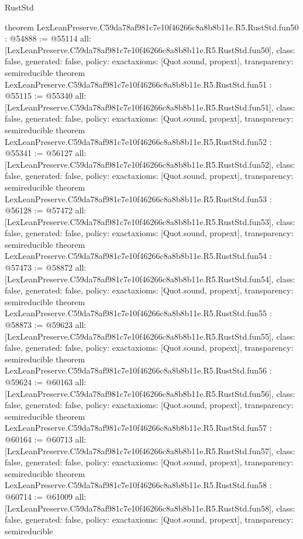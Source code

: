 \begin{lexlean}{RustStd}
\begin{coremodule}
{}
theorem LexLeanPreserve.C59da78af981c7e10f46266c8a8b8b11e.R5.RustStd.fun50 : @54888 := @55114 {
  all: [LexLeanPreserve.C59da78af981c7e10f46266c8a8b8b11e.R5.RustStd.fun50],
  class: false,
  generated: false,
  policy: exact{axioms: [Quot.sound, propext]},
  transparency: semireducible
}
theorem LexLeanPreserve.C59da78af981c7e10f46266c8a8b8b11e.R5.RustStd.fun51 : @55115 := @55340 {
  all: [LexLeanPreserve.C59da78af981c7e10f46266c8a8b8b11e.R5.RustStd.fun51],
  class: false,
  generated: false,
  policy: exact{axioms: [Quot.sound, propext]},
  transparency: semireducible
}
theorem LexLeanPreserve.C59da78af981c7e10f46266c8a8b8b11e.R5.RustStd.fun52 : @55341 := @56127 {
  all: [LexLeanPreserve.C59da78af981c7e10f46266c8a8b8b11e.R5.RustStd.fun52],
  class: false,
  generated: false,
  policy: exact{axioms: [Quot.sound, propext]},
  transparency: semireducible
}
theorem LexLeanPreserve.C59da78af981c7e10f46266c8a8b8b11e.R5.RustStd.fun53 : @56128 := @57472 {
  all: [LexLeanPreserve.C59da78af981c7e10f46266c8a8b8b11e.R5.RustStd.fun53],
  class: false,
  generated: false,
  policy: exact{axioms: [Quot.sound, propext]},
  transparency: semireducible
}
theorem LexLeanPreserve.C59da78af981c7e10f46266c8a8b8b11e.R5.RustStd.fun54 : @57473 := @58872 {
  all: [LexLeanPreserve.C59da78af981c7e10f46266c8a8b8b11e.R5.RustStd.fun54],
  class: false,
  generated: false,
  policy: exact{axioms: [Quot.sound, propext]},
  transparency: semireducible
}
theorem LexLeanPreserve.C59da78af981c7e10f46266c8a8b8b11e.R5.RustStd.fun55 : @58873 := @59623 {
  all: [LexLeanPreserve.C59da78af981c7e10f46266c8a8b8b11e.R5.RustStd.fun55],
  class: false,
  generated: false,
  policy: exact{axioms: [Quot.sound, propext]},
  transparency: semireducible
}
theorem LexLeanPreserve.C59da78af981c7e10f46266c8a8b8b11e.R5.RustStd.fun56 : @59624 := @60163 {
  all: [LexLeanPreserve.C59da78af981c7e10f46266c8a8b8b11e.R5.RustStd.fun56],
  class: false,
  generated: false,
  policy: exact{axioms: [Quot.sound, propext]},
  transparency: semireducible
}
theorem LexLeanPreserve.C59da78af981c7e10f46266c8a8b8b11e.R5.RustStd.fun57 : @60164 := @60713 {
  all: [LexLeanPreserve.C59da78af981c7e10f46266c8a8b8b11e.R5.RustStd.fun57],
  class: false,
  generated: false,
  policy: exact{axioms: [Quot.sound, propext]},
  transparency: semireducible
}
theorem LexLeanPreserve.C59da78af981c7e10f46266c8a8b8b11e.R5.RustStd.fun58 : @60714 := @61009 {
  all: [LexLeanPreserve.C59da78af981c7e10f46266c8a8b8b11e.R5.RustStd.fun58],
  class: false,
  generated: false,
  policy: exact{axioms: [Quot.sound, propext]},
  transparency: semireducible
}
\end{coremodule}
\end{lexlean}
